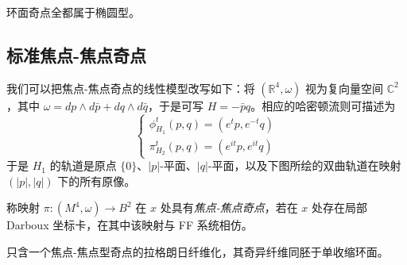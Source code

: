 环面奇点全都属于椭圆型。

\subsection{标准焦点-焦点奇点}

我们可以把焦点-焦点奇点的线性模型改写如下：将 $(\mathbb{R}^4,\omega)$ 视为复向量空间 $\mathbb{C}^2$，其中 $\omega =dp\wedge d\bar{p}+dq\wedge d\bar{q}$，于是可写 $H=-\bar{p}q$。相应的哈密顿流则可描述为
\[
\left\lbrace\begin{array}{l}\phi_{H_1}^t (p,q)=(e^tp,e^{-t}q)\\\pi_{H_2}^t (p,q)=(e^{it}p,e^{it}q)\end{array}\right.
\]
于是 $H_1$ 的轨道是原点 $\{0\}$、$\vert p\vert$-平面、$\vert q\vert$-平面，以及下图所绘的双曲轨道在映射 $(\vert p\vert, \vert q\vert)$ 下的所有原像。

\begin{figure}[htbp]
\centering
{}
\end{figure}


\begin{definition*}
称映射 $\pi\colon (M^4,\omega)\to B^2$ 在 $x$ 处具有\emph{焦点-焦点奇点}，若在 $x$ 处存在局部 Darboux 坐标卡，在其中该映射与 FF 系统相仿。
\end{definition*}

\begin{proposition*}
只含一个焦点-焦点型奇点的拉格朗日纤维化，其奇异纤维同胚于单收缩环面。
\end{proposition*}

